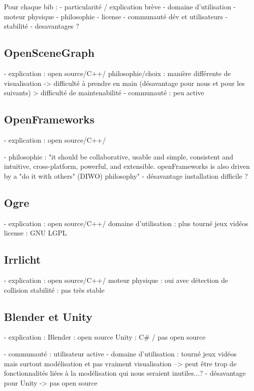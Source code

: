 Pour chaque bib : 
- particularité / explication brève
- domaine d'utilisation
- moteur physique 
- philosophie
- license
- communauté dév et utilisateurs
- stabilité
- desavantages ?

\subsection{OpenSceneGraph}
- explication : open source/C++/
philosophie/choix :  manière différente de visualisation -> difficulté à prendre en main (désavantage pour nous et pour les suivants) > difficulté de maintenabilité
- communauté : peu active

\subsection{OpenFrameworks}
- explication : open source/C++/

- philosophie : "it should be collaborative, usable and simple, consistent and intuitive, cross-platform, powerful, and extensible. openFrameworks is also driven by a "do it with others" (DIWO) philosophy"
- désavantage installation difficile ?


\subsection{Ogre}
- explication : open source/C++/
domaine d'utilisation :  plus tourné jeux vidéos 
license : GNU LGPL \\

\subsection{Irrlicht}
- explication : open source/C++/
moteur physique : oui avec détection de collision
stabilité : pas très stable 

\subsection{Blender et Unity}
- explication : Blender : open source
				Unity : C\# / pas open source
				
- communauté  : utilisateur active
- domaine d'utilisation : tourné jeux vidéos mais surtout modélisation et pas vraiment visualisation
--> peut être trop de fonctionnalités liées à la modélisation qui nous seraient inutiles...?
- désavantage pour Unity -> pas open source


